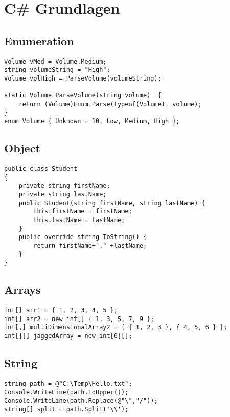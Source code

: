 \section{C\# Grundlagen}

\subsection{Enumeration}
\begin{lstlisting}
Volume vMed = Volume.Medium;
string volumeString = "High";
Volume volHigh = ParseVolume(volumeString);

static Volume ParseVolume(string volume)  {
    return (Volume)Enum.Parse(typeof(Volume), volume);
}
enum Volume { Unknown = 10, Low, Medium, High };
\end{lstlisting}


\subsection{Object}
\begin{lstlisting}
public class Student
{
    private string firstName;
    private string lastName; 
    public Student(string firstName, string lastName) {
        this.firstName = firstName;
        this.lastName = lastName;
    }
    public override string ToString() {
        return firstName+"," +lastName;
    }
}
\end{lstlisting}


\subsection{Arrays}
\begin{lstlisting}
int[] arr1 = { 1, 2, 3, 4, 5 };
int[] arr2 = new int[] { 1, 3, 5, 7, 9 };
int[,] multiDimensionalArray2 = { { 1, 2, 3 }, { 4, 5, 6 } };
int[][] jaggedArray = new int[6][];
\end{lstlisting}


\subsection{String}
\begin{lstlisting}
string path = @"C:\Temp\Hello.txt";
Console.WriteLine(path.ToUpper());
Console.WriteLine(path.Replace(@"\","/"));
string[] split = path.Split('\\');
\end{lstlisting}